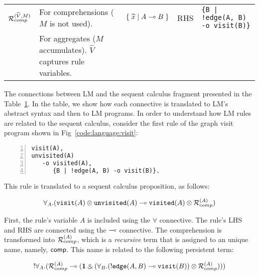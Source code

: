 \begin{table*}
\begin{center}
{\begin{tabular}{ | l | l || l | l | l |}
                                 $\mathcal{R}_{comp}^{(\widehat{V}, M)}$               & For comprehensions
    ($M$ is not used).  & $\{ \; \widehat{x} \; | \; A \multimap B \; \}$  & RHS & \texttt{\{B | !edge(A, B) -o visit(B)\}}        \\
    & For aggregates ($M$ accumulates). $\widehat{V}$ captures rule variables.          &                                               &                 &                                                \\ \hline
    \end{tabular}
}
\end{center}
\label{table:linear}
\end{table*}

The connections between LM and the sequent calculus fragment presented in the
Table~\ref{table:linear}. In the table, we show how each connective is
translated to LM's abstract syntax and then to LM programs. In order to
understand how LM rules are related to the sequent calculus, consider the first
rule of the graph visit program shown in Fig~\ref{code:language:visit}:

\begin{Verbatim}[numbers=left,fontsize=\codesize,commandchars=\*\[\]]
visit(A),
unvisited(A)
   -o visited(A),
      {B | !edge(A, B) -o visit(B)}.
\end{Verbatim}

This rule is translated to a sequent calculus proposition, as follows:

\begin{align}
\forall_A. (\texttt{visit}(A) \otimes \texttt{unvisited}(A) \multimap
   \texttt{visited}(A) \otimes \mathcal{R}_{comp}^{(A)})
\end{align}

First, the rule's variable $A$ is included using the $\forall$ connective. The
rule's LHS and RHS are connected using the $\multimap$ connective. The
comprehension is transformed into $\mathcal{R}_{comp}^{(A)}$, which is a
\emph{recursive} term that is assigned to an unique name, namely, $\mathsf{comp}$.
This name is related to the following persistent term:

\begin{align}
{!} \forall_A. (\mathcal{R}_{comp}^{(A)} \multimap (\mathbf{1} \mathbin{\binampersand}
         (\forall_B. ({!} \texttt{edge}(A, B) \multimap
                                             \texttt{visit}(B)) \otimes
          \mathcal{R}_{comp}^{(A)})))
\end{align}

